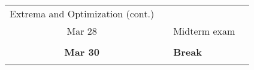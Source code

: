 \documentclass[
]{article}
\begin{document}
\begin{longtable}[]{@{}cclc@{}}
\begin{minipage}[t]{0.55\columnwidth}
Extrema and Optimization (cont.)\strut
\end{minipage} & \begin{minipage}[t]{0.12\columnwidth}\centering
\strut
\end{minipage}\tabularnewline
\begin{minipage}[t]{0.12\columnwidth}\centering
Mar 28\strut
\end{minipage} & \begin{minipage}[t]{0.10\columnwidth}\centering
15\strut
\end{minipage} & \begin{minipage}[t]{0.55\columnwidth}\raggedright
Midterm exam\strut
\end{minipage} & \begin{minipage}[t]{0.12\columnwidth}\centering
\strut
\end{minipage}\tabularnewline
\begin{minipage}[t]{0.12\columnwidth}\centering
\strut
\end{minipage} & \begin{minipage}[t]{0.10\columnwidth}\centering
\strut
\end{minipage} & \begin{minipage}[t]{0.55\columnwidth}\raggedright
\strut
\end{minipage} & \begin{minipage}[t]{0.12\columnwidth}\centering
\strut
\end{minipage}\tabularnewline
\begin{minipage}[t]{0.12\columnwidth}\centering
\textbf{Mar 30}\strut
\end{minipage} & \begin{minipage}[t]{0.10\columnwidth}\centering
\strut
\end{minipage} & \begin{minipage}[t]{0.55\columnwidth}\raggedright
\textbf{Break}\strut
\end{minipage} & \begin{minipage}[t]{0.12\columnwidth}\centering
\strut
\end{minipage}\tabularnewline
\begin{minipage}[t]{0.12\columnwidth}\centering
\strut
\end{minipage} & \begin{minipage}[t]{0.10\columnwidth}\centering
\strut
\end{minipage} & \begin{minipage}[t]{0.55\columnwidth}\raggedright
\strut
\end{minipage} & \begin{minipage}[t]{0.12\columnwidth}\centering

\end{minipage}
\end{longtable}
\end{document}
